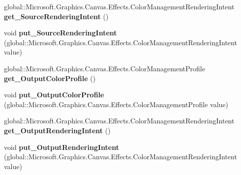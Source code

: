 \begin{DoxyCompactItemize}
\item 
\mbox{\label{class_microsoft_1_1_graphics_1_1_canvas_1_1_effects_1_1_color_management_effect_a3e5a8a23a3a6aa5fd2f094f13e898a44}} 
global\+::\+Microsoft.\+Graphics.\+Canvas.\+Effects.\+Color\+Management\+Rendering\+Intent {\bfseries get\+\_\+\+Source\+Rendering\+Intent} ()
\item 
\mbox{\label{class_microsoft_1_1_graphics_1_1_canvas_1_1_effects_1_1_color_management_effect_ae01d8260768b483504a24daed27da2b8}} 
void {\bfseries put\+\_\+\+Source\+Rendering\+Intent} (global\+::\+Microsoft.\+Graphics.\+Canvas.\+Effects.\+Color\+Management\+Rendering\+Intent value)
\item 
\mbox{\label{class_microsoft_1_1_graphics_1_1_canvas_1_1_effects_1_1_color_management_effect_a74ae08e1f5d954e1f9d89ddd5af9653d}} 
global\+::\+Microsoft.\+Graphics.\+Canvas.\+Effects.\+Color\+Management\+Profile {\bfseries get\+\_\+\+Output\+Color\+Profile} ()
\item 
\mbox{\label{class_microsoft_1_1_graphics_1_1_canvas_1_1_effects_1_1_color_management_effect_a8cc3db4456f5009c8bb5932d1ba34690}} 
void {\bfseries put\+\_\+\+Output\+Color\+Profile} (global\+::\+Microsoft.\+Graphics.\+Canvas.\+Effects.\+Color\+Management\+Profile value)
\item 
\mbox{\label{class_microsoft_1_1_graphics_1_1_canvas_1_1_effects_1_1_color_management_effect_ab3f873d532a7ac2daad8c8891c039b7b}} 
global\+::\+Microsoft.\+Graphics.\+Canvas.\+Effects.\+Color\+Management\+Rendering\+Intent {\bfseries get\+\_\+\+Output\+Rendering\+Intent} ()
\item 
\mbox{\label{class_microsoft_1_1_graphics_1_1_canvas_1_1_effects_1_1_color_management_effect_a18c1f342b105332ae8a95cb11dcba930}} 
void {\bfseries put\+\_\+\+Output\+Rendering\+Intent} (global\+::\+Microsoft.\+Graphics.\+Canvas.\+Effects.\+Color\+Management\+Rendering\+Intent value)

\end{DoxyCompactItemize}
